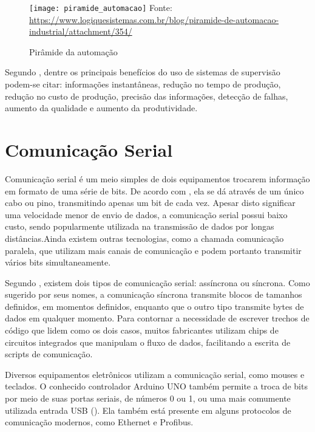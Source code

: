 \begin{figure}[hbt]
	\centering
	\caption{Pirâmide da automação}
	\texttt{[image: piramide\_automacao]}
	Fonte: \href{https://www.logiquesistemas.com.br/blog/piramide-de-automacao-industrial/attachment/354/}{https://www.logiquesistemas.com.br/blog/piramide-de-automacao-industrial/attachment/354/}
	\label{img_piramide_automacao}
\end{figure}

Segundo , dentre os principais benefícios do uso de sistemas de supervisão podem-se citar: informações instantâneas, redução no tempo de produção, redução no custo de produção, precisão das informações, detecção de falhas, aumento da qualidade e aumento da produtividade.

\section{Comunicação Serial}

Comunicação serial é um meio simples de dois equipamentos trocarem informação em formato de uma série de bits. De acordo com , ela se dá através de um único cabo ou pino, transmitindo apenas um bit de cada vez. Apesar disto significar uma velocidade menor de envio de dados, a comunicação serial possui baixo custo, sendo popularmente utilizada na transmissão de dados por longas distâncias.Ainda existem outras tecnologias, como a chamada comunicação paralela, que utilizam mais canais de comunicação e podem portanto transmitir vários bits simultaneamente.

Segundo , existem dois tipos de comunicação serial: assíncrona ou síncrona. Como sugerido por seus nomes, a comunicação síncrona transmite blocos de tamanhos definidos, em momentos definidos, enquanto que o outro tipo transmite bytes de dados em qualquer momento. Para contornar a necessidade de escrever trechos de código que lidem como os dois casos, muitos fabricantes utilizam chips de circuitos integrados que manipulam o fluxo de dados, facilitando a escrita de scripts de comunicação.

Diversos equipamentos eletrônicos utilizam a comunicação serial, como mouses e teclados. O conhecido controlador Arduino UNO também permite a troca de bits por meio de suas portas seriais, de números 0 ou 1, ou uma mais comumente utilizada entrada USB (\cite{ArduinoSerial}). Ela também está presente em alguns protocolos de comunicação modernos, como Ethernet e Profibus.

